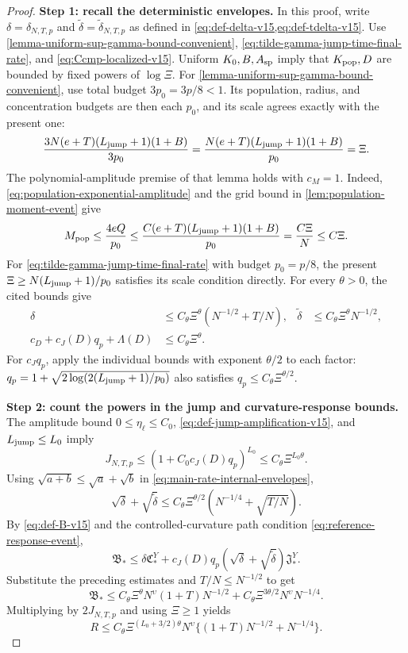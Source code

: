 \begin{proof}
\noindent\textbf{Step 1: recall the deterministic envelopes.}
In this proof, write $\delta=\delta_{N,T,p}$ and
$\widetilde\delta=\widetilde\delta_{N,T,p}$ as defined in
\cref{eq:def-delta-v15,eq:def-tdelta-v15}.
Use \cref{lemma-uniform-sup-gamma-bound-convenient},
\eqref{eq:tilde-gamma-jump-time-final-rate}, and
\eqref{eq:Ccmp-localized-v15}. Uniform $K_0,B,A_{\rm sp}$ imply that
$K_{\rm pop},D$ are bounded by fixed powers of $\log\Xi$.
For \cref{lemma-uniform-sup-gamma-bound-convenient}, use total budget
$3p_0=3p/8<1$. Its population, radius, and concentration budgets are
then each $p_0$, and its scale agrees exactly with the present one:
\[
 \frac{3N(e+T)(L_{\mathrm{jump}}+1)(1+B)}{3p_0}
 =\frac{N(e+T)(L_{\mathrm{jump}}+1)(1+B)}{p_0}=\Xi.
\]
The polynomial-amplitude premise of that lemma holds with $c_M=1$.
Indeed, \cref{eq:population-exponential-amplitude} and the grid bound in
\cref{lem:population-moment-event} give
\[
 M_{\rm pop}\le\frac{4eQ}{p_0}
 \le\frac{C(e+T)(L_{\mathrm{jump}}+1)(1+B)}{p_0}
 =\frac{C\Xi}{N}\le C\Xi.
\]
For \eqref{eq:tilde-gamma-jump-time-final-rate} with budget $p_0=p/8$,
the present $\Xi\ge N(L_{\mathrm{jump}}+1)/p_0$ satisfies its scale condition
directly. For every $\theta>0$, the cited bounds give
\begin{equation}
\label{eq:main-rate-internal-envelopes}
\begin{aligned}
 \delta&\le C_\theta\Xi^\theta(N^{-1/2}+T/N),&
 \widetilde\delta&\le C_\theta\Xi^\theta N^{-1/2},\\
 c_D+c_J(D)q_p+\Lambda(D)&\le C_\theta\Xi^\theta.
\end{aligned}
\end{equation}
For $c_Jq_p$, apply the individual bounds with exponent $\theta/2$ to
each factor: $q_p=1+\sqrt{2\log(2(L_{\mathrm{jump}}+1)/p_0)}$ also satisfies
$q_p\le C_\theta\Xi^{\theta/2}$.

\par\noindent\textbf{Step 2: count the powers in the jump and curvature-response bounds.}
The amplitude bound $0\le\eta_\ell\le C_0$,
\eqref{eq:def-jump-amplification-v15}, and $L_{\mathrm{jump}}\le L_0$ imply
\[
 J_{N,T,p}\le(1+C_0c_J(D)q_p)^{L_0}
             \le C_\theta\Xi^{L_0\theta}.
\]
Using $\sqrt{a+b}\le\sqrt a+\sqrt b$ in
\eqref{eq:main-rate-internal-envelopes},
\[
 \sqrt\delta+\sqrt{\widetilde\delta}
 \le C_\theta\Xi^{\theta/2}(N^{-1/4}+\sqrt{T/N}).
\]
By \eqref{eq:def-B-v15} and the controlled-curvature path condition
\eqref{eq:reference-response-event},
\[
 \mathfrak B_*\le\delta\mathfrak C_*^Y
       +c_J(D)q_p(\sqrt\delta+\sqrt{\widetilde\delta})\mathfrak J_*^Y.
\]
Substitute the preceding estimates and $T/N\le N^{-1/2}$ to get
\[
 \mathfrak B_*
 \le C_\theta\Xi^\theta N^\upsilon(1+T)N^{-1/2}
       +C_\theta\Xi^{3\theta/2}N^\upsilon N^{-1/4}.
\]
Multiplying by $2J_{N,T,p}$ and using $\Xi\ge1$ yields
\[
 R\le C_\theta\Xi^{(L_0+3/2)\theta}N^\upsilon
         \{(1+T)N^{-1/2}+N^{-1/4}\}.
\]


\end{proof}

